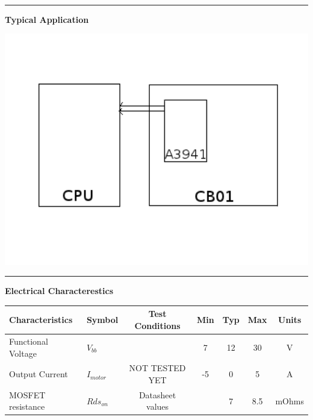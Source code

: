 \documentclass{article}
\begin{document}
\\
\hspace{0.3in}
\hrule
\hspace{0.3in}
\begin{center} 
\large{\textbf{Typical Application}}
\end{center}
\begin{center}
\includegraphics[width=6in]{cb01_typical.png}
\end{center}
\hrule
\newpage
\large{\textbf{Electrical Characterestics}} \\
\begin{center}
\begin{tabular}{|l | l |c| c|c|c|c|}
\hline
Characteristics & Symbol &Test Conditions & Min & Typ & Max & Units \\ \hline
Functional Voltage& $V_{bb}$& & 7&12&30&V \\ \hline 
Output Current & $I_{motor}$ & NOT TESTED YET& -5 & 0& 5 &A \\ \hline
MOSFET resistance & $Rds_{on}$  & Datasheet values& & 7 & 8.5 & mOhms\\\hline
\hline
\end{tabular}
\end{center}
\end{document}
